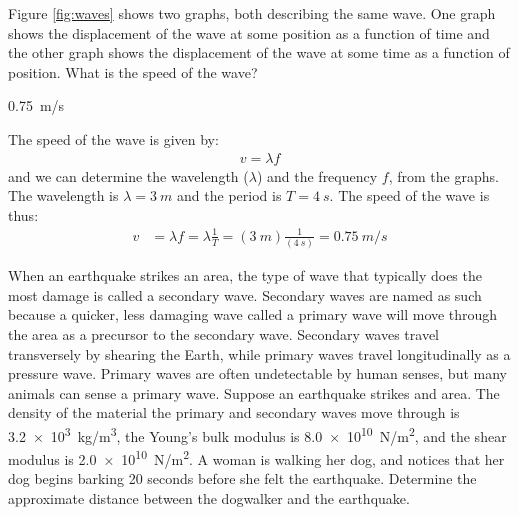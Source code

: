 



\question Figure \ref{fig:waves} shows two graphs, both describing the same wave. One graph shows the displacement of the wave at some position as a function of time and the other graph shows the displacement of the wave at some time as a function of position. What is the speed of the wave?
\begin{finalanswer}
\SI{0.75}{m/s}
\end{finalanswer}
\begin{solution}
The speed of the wave is given by:
\begin{align*}
v = \lambda f
\end{align*}
and we can determine the wavelength ($\lambda$) and the frequency $f$, from the graphs. The wavelength is $\lambda=\SI{3}{m}$ and the period is $T=\SI{4}{s}$. The speed of the wave is thus:
\begin{align*}
v &= \lambda f=\lambda \frac{1}{T}=(\SI{3}{m})\frac{1}{(\SI{4}{s})}=\SI{0.75}{m/s}
\end{align*}
\end{solution}

\question When an earthquake strikes an area, the type of wave that typically does the most damage is called a secondary wave. Secondary waves are named as such because a quicker, less damaging wave called a primary wave will move through the area as a precursor to the secondary wave. Secondary waves travel transversely by shearing the Earth, while primary waves travel longitudinally as a pressure wave. Primary waves are often undetectable by human senses, but many animals can sense a primary wave. Suppose an earthquake strikes and area. The density of the material the primary and secondary waves move through is \SI{3.2e3}{kg/m^3}, the Young's bulk modulus is \SI{8.0e10}{N/m^2}, and the shear modulus is \SI{2.0e10}{N/m^2}. A woman is walking her dog, and notices that her dog begins barking 20 seconds before she felt the earthquake. Determine the approximate distance between the dogwalker and the earthquake.

